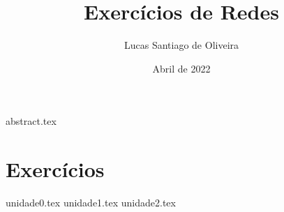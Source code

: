 \documentclass[twoside, 12pt]{article}
\title{Exercícios de Redes}
\author{Lucas Santiago de Oliveira}
\date{Abril de 2022}
\begin{document}
    \maketitle
    \tableofcontents
    {abstract.tex}

    \section*{Exercícios}
    {unidade0.tex}
    {unidade1.tex}  
    {unidade2.tex}

    \printbibliography
    
\end{document}
